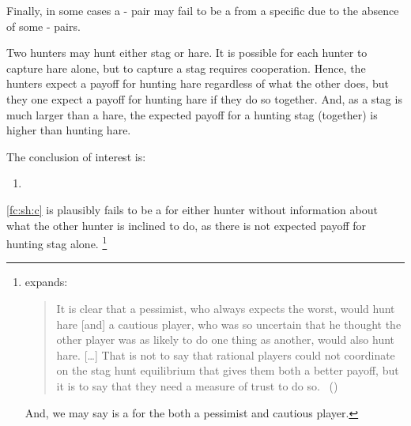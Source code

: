 \begin{note}
  Finally, in some cases a - pair may fail to be a \fc{} from a specific \pool{} due to the absence of some - pairs.

  \begin{scenario}%
    \label{fc:sh}%
    Two hunters may hunt either stag or hare.
    It is possible for each hunter to capture hare alone, but to capture a stag requires cooperation.
    Hence, the hunters expect a payoff for hunting hare regardless of what the other does, but they one expect a payoff for hunting hare if they do so together.
    And, as a stag is much larger than a hare, the expected payoff for a hunting stag (together) is higher than hunting hare.
  \end{scenario}

  \noindent%
  The conclusion of interest is:

  \begin{enumerate}[label=C\thescenarioCounter., ref=C\thescenarioCounter]
  \item
    \label{fc:sh:c}
  \end{enumerate}
  \ref{fc:sh:c} is plausibly fails to be a \fc{} for either hunter without information about what the other hunter is inclined to do, as there is not expected payoff for hunting stag alone.%
  \footnote{
    \citeauthor{Skyrms:2004aa} expands:
    \begin{quote}
      It is clear that a pessimist, who always expects the worst, would hunt hare [and] a cautious player, who was so uncertain that he thought the other player was as likely to do one thing as another, would also hunt hare.
      [\dots]
      That is not to say that rational players could not coordinate on the stag hunt equilibrium that gives them both a better payoff, but it is to say that they need a measure of trust to do so.%
      \mbox{ }\hfill\mbox{(\citeyear[3]{Skyrms:2004aa})}
    \end{quote}
    And, we may say  is a \fc{} for the both a pessimist and cautious player.
  }
\end{note}




